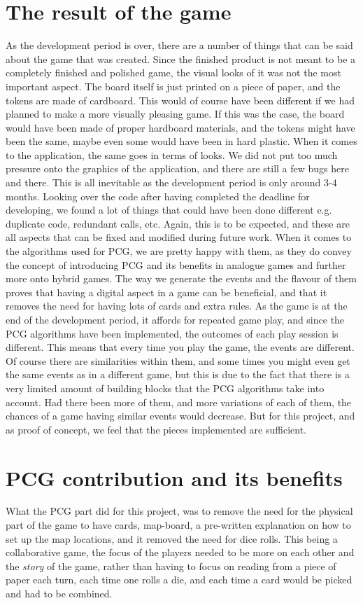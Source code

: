 \section{The result of the game}
As the development period is over, there are a number of things that can be said about the game that was created. Since the finished product is not meant to be a completely finished and polished game, the visual looks of it was not the most important aspect. The board itself is just printed on a piece of paper, and the tokens are made of cardboard. This would of course have been different if we had planned to make a more visually pleasing game. If this was the case, the board would have been made of proper hardboard materials, and the tokens might have been the same, maybe even some would have been in hard plastic. When it comes to the application, the same goes in terms of looks. We did not put too much pressure onto the graphics of the application, and there are still a few bugs here and there. This is all inevitable as the development period is only around 3-4 months. Looking over the code after having completed the deadline for developing, we found a lot of things that could have been done different e.g. duplicate code, redundant calls, etc. Again, this is to be expected, and these are all aspects that can be fixed and modified during future work.
When it comes to the algorithms used for PCG, we are pretty happy with them, as they do convey the concept of introducing PCG and its benefits in analogue games and further more onto hybrid games. The way we generate the events and the flavour of them proves that having a digital aspect in a game can be beneficial, and that it removes the need for having lots of cards and extra rules. As the game is at the end of the development period, it affords for repeated game play, and since the PCG algorithms have been implemented, the outcomes of each play session is different. This means that every time you play the game, the events are different. Of course there are similarities within them, and some times you might even get the same events as in a different game, but this is due to the fact that there is a very limited amount of building blocks that the PCG algorithms take into account. Had there been more of them, and more variations of each of them, the chances of a game having similar events would decrease. But for this project, and as proof of concept, we feel that the pieces implemented are sufficient.

\section{PCG contribution and its benefits}
\label{sec:pcgben}
What the PCG part did for this project, was to remove the need for the physical part of the game to have cards, map-board, a pre-written explanation on how to set up the map locations, and it removed the need for dice rolls. This being a collaborative game, the focus of the players needed to be more on each other and the \textit{story} of the game, rather than having to focus on reading from a piece of paper each turn, each time one rolls a die, and each time a card would be picked and had to be combined.

